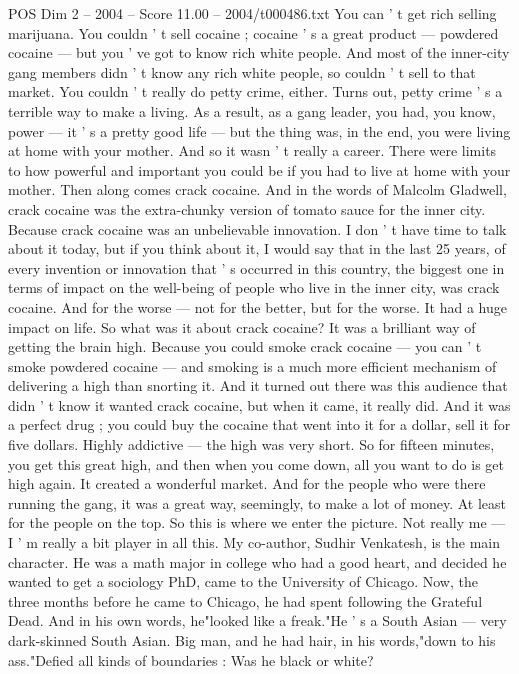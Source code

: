 \begin{textsample}{POS Dim 2 – 2004 – Score 11.00 – 2004/t000486.txt}
You can ' t get rich selling marijuana.
You couldn ' t sell cocaine ; cocaine ' s a great product — powdered cocaine — but you ' ve got to know rich white people.
And most of the inner-city gang members didn ' t know any rich white people, so couldn ' t sell to that market.
You couldn ' t really do petty crime, either.
Turns out, petty crime ' s a terrible way to make a living.
As a result, as a gang leader, you had, you know, power — it ' s a pretty good life — but the thing was, in the end, you were living at home with your mother.
And so it wasn ' t really a career.
There were limits to how powerful and important you could be if you had to live at home with your mother.
Then along comes crack cocaine.
And in the words of Malcolm Gladwell, crack cocaine was the extra-chunky version of tomato sauce for the inner city.
Because crack cocaine was an unbelievable innovation.
I don ' t have time to talk about it today, but if you think about it, I would say that in the last 25 years, of every invention or innovation that ' s occurred in this country, the biggest one in terms of impact on the well-being of people who live in the inner city, was crack cocaine.
And for the worse — not for the better, but for the worse.
It had a huge impact on life.
So what was it about crack cocaine?
It was a brilliant way of getting the brain high.
Because you could smoke crack cocaine — you can ' t smoke powdered cocaine — and smoking is a much more efficient mechanism of delivering a high than snorting it.
And it turned out there was this audience that didn ' t know it wanted crack cocaine, but when it came, it really did.
And it was a perfect drug ; you could buy the cocaine that went into it for a dollar, sell it for five dollars.
Highly addictive — the high was very short.
So for fifteen minutes, you get this great high, and then when you come down, all you want to do is get high again.
It created a wonderful market.
And for the people who were there running the gang, it was a great way, seemingly, to make a lot of money.
At least for the people on the top.
So this is where we enter the picture.
Not really me — I ' m really a bit player in all this.
My co-author, Sudhir Venkatesh, is the main character.
He was a math major in college who had a good heart, and decided he wanted to get a sociology PhD, came to the University of Chicago.
Now, the three months before he came to Chicago, he had spent following the Grateful Dead.
And in his own words, he"looked like a freak."He ' s a South Asian — very dark-skinned South Asian.
Big man, and he had hair, in his words,"down to his ass."Defied all kinds of boundaries : Was he black or white?

\end{textsample}
